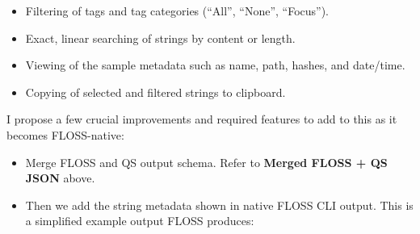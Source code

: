 \documentclass[12pt]{article}
\begin{document}
\begin{itemize}
    \item Filtering of tags and tag categories (``All'', ``None'', ``Focus'').
    \item Exact, linear searching of strings by content or length.
    \item Viewing of the sample metadata such as name, path, hashes, and date/time.
    \item Copying of selected and filtered strings to clipboard.
\end{itemize}

I propose a few crucial improvements and required features to add to this as it becomes FLOSS-native:

\begin{itemize}
    \item Merge FLOSS and QS output schema. Refer to \textbf{Merged FLOSS + QS JSON} above.
    \item Then we add the string metadata shown in native FLOSS CLI output. This is a simplified example output FLOSS produces:


\end{itemize}
\end{document}
